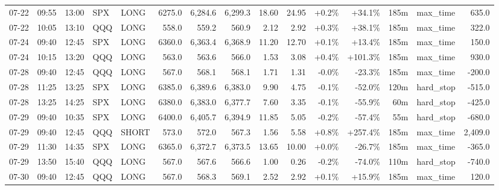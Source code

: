 \documentclass[11pt,a4paper,twoside]{article}
\begin{document}
\begin{landscape}
\begin{center}
\begin{longtable}{>{\color{txtmain}}l l l l l r r r r r r r r >{\color{txtmain}}l r}
07-22 & 09:55 & 13:00 & SPX & LONG & 6275.0 & 6,284.6 & 6,299.3 & 18.60 & 24.95 & \textcolor{wingreen}{+0.2\%} & \textcolor{wingreen}{+34.1\%} & 185m & max\_time & \textcolor{wingreen}{635.0} \\
07-22 & 10:05 & 13:10 & QQQ & LONG & 558.0 & 559.2 & 560.9 & 2.12 & 2.92 & \textcolor{wingreen}{+0.3\%} & \textcolor{wingreen}{+38.1\%} & 185m & max\_time & \textcolor{wingreen}{322.0} \\
07-24 & 09:40 & 12:45 & SPX & LONG & 6360.0 & 6,363.4 & 6,368.9 & 11.20 & 12.70 & \textcolor{wingreen}{+0.1\%} & \textcolor{wingreen}{+13.4\%} & 185m & max\_time & \textcolor{wingreen}{150.0} \\
07-24 & 10:15 & 13:20 & QQQ & LONG & 563.0 & 563.6 & 566.0 & 1.53 & 3.08 & \textcolor{wingreen}{+0.4\%} & \textcolor{wingreen}{+101.3\%} & 185m & max\_time & \textcolor{wingreen}{930.0} \\
07-28 & 09:40 & 12:45 & QQQ & LONG & 567.0 & 568.1 & 568.1 & 1.71 & 1.31 & \textcolor{lossred}{-0.0\%} & \textcolor{lossred}{-23.3\%} & 185m & max\_time & \textcolor{lossred}{-200.0} \\
07-28 & 11:25 & 13:25 & SPX & LONG & 6385.0 & 6,389.6 & 6,383.0 & 9.90 & 4.75 & \textcolor{lossred}{-0.1\%} & \textcolor{lossred}{-52.0\%} & 120m & hard\_stop & \textcolor{lossred}{-515.0} \\
07-28 & 13:25 & 14:25 & SPX & LONG & 6380.0 & 6,383.0 & 6,377.7 & 7.60 & 3.35 & \textcolor{lossred}{-0.1\%} & \textcolor{lossred}{-55.9\%} & 60m & hard\_stop & \textcolor{lossred}{-425.0} \\
07-29 & 09:40 & 10:35 & SPX & LONG & 6400.0 & 6,405.7 & 6,394.9 & 11.85 & 5.05 & \textcolor{lossred}{-0.2\%} & \textcolor{lossred}{-57.4\%} & 55m & hard\_stop & \textcolor{lossred}{-680.0} \\
07-29 & 09:40 & 12:45 & QQQ & SHORT & 573.0 & 572.0 & 567.3 & 1.56 & 5.58 & \textcolor{wingreen}{+0.8\%} & \textcolor{wingreen}{+257.4\%} & 185m & max\_time & \textcolor{wingreen}{2,409.0} \\
07-29 & 11:30 & 14:35 & SPX & LONG & 6365.0 & 6,372.7 & 6,373.5 & 13.65 & 10.00 & \textcolor{wingreen}{+0.0\%} & \textcolor{lossred}{-26.7\%} & 185m & max\_time & \textcolor{lossred}{-365.0} \\
07-29 & 13:50 & 15:40 & QQQ & LONG & 567.0 & 567.6 & 566.6 & 1.00 & 0.26 & \textcolor{lossred}{-0.2\%} & \textcolor{lossred}{-74.0\%} & 110m & hard\_stop & \textcolor{lossred}{-740.0} \\
07-30 & 09:40 & 12:45 & QQQ & LONG & 567.0 & 568.3 & 569.1 & 2.52 & 2.92 & \textcolor{wingreen}{+0.1\%} & \textcolor{wingreen}{+15.9\%} & 185m & max\_time & \textcolor{wingreen}{120.0} \\

\end{longtable}
\end{center}
\end{landscape}
\end{document}
